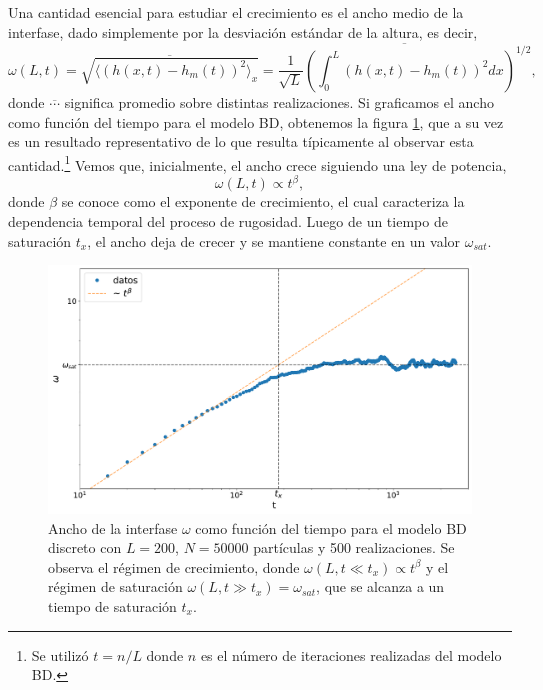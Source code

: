 Una cantidad esencial para estudiar el crecimiento es el ancho medio de la interfase, dado simplemente por la desviación estándar de la altura, es decir,
\begin{equation}
\omega(L,t) = \overline{\sqrt{\langle (h(x,t) - h_m(t))^2 \rangle_x}}= \overline{\frac{1}{\sqrt{L}}\left(\int_{0}^{L}(h(x,t) - h_m(t))^2 dx\right)^{1/2}},
\end{equation}
donde $\overline{\cdots}$ significa promedio sobre distintas realizaciones.
Si graficamos el ancho como función del tiempo para el modelo BD, obtenemos la figura \ref{fig:width}, que a su vez es un resultado representativo de lo que 
resulta típicamente al observar esta cantidad.\footnote{Se utilizó $t = n/L$ donde $n$ es el número de iteraciones realizadas del modelo BD.} Vemos que, inicialmente, el ancho crece siguiendo una ley de potencia, 
\begin{equation}
\omega (L,t) \propto t^{\beta},
\end{equation}
donde $\beta$ se conoce como el exponente de crecimiento, el cual caracteriza la dependencia temporal del proceso de rugosidad. Luego de un tiempo de saturación $t_x$, 
el ancho deja de crecer y se mantiene constante en un valor $\omega_{sat}$.

\begin{figure}[!b]
    \centering
    \includegraphics[width=\imsizeL]{width.pdf}
    \caption[Ancho de la interfase como función del tiempo para el modelo BD discreto.]{Ancho de la interfase $\omega$ como función del tiempo para el modelo BD discreto con $L = 200$, $N = 50000$ partículas y 500 realizaciones. Se observa el régimen de crecimiento, 
    donde $\omega(L,t \ll t_x) \propto t^\beta$ y el régimen de saturación $\omega(L,t \gg t_x) = \omega_{sat}$, que se alcanza a un tiempo de saturación $t_x$.}
    \label{fig:width}
\end{figure}


